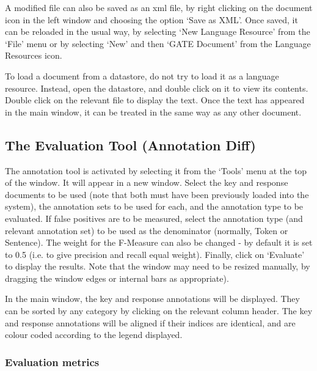 A modified file can also be saved as an xml file, by right clicking on
the document icon in the left window and choosing the
option `Save as XML'. Once saved, it can be reloaded in the usual way,
by selecting `New Language Resource' from the `File' menu or by
selecting `New' and then `GATE Document' from the Language Resources icon.

To load a document from a datastore, do not try to load it as a
language resource. Instead, open the datastore, and double click on
it to view its contents. Double click on the relevant file to display
the text. Once the text has appeared in the main window, it can be
treated in the same way as any other document.


\subsection{The Evaluation Tool (Annotation Diff)}

The annotation tool is activated by selecting it from the 
`Tools' menu at the top of the window. It will appear in a new
window. Select the key and response documents to be used (note that
both must have been previously loaded into the system), the annotation
sets to be used for each, and the annotation
type to be evaluated. If false positives are to be measured, select
the annotation type (and relevant annotation set) to be used as the
denominator (normally, Token or Sentence). The weight for the
F-Measure can also be changed - by default it is set to 0.5 (i.e. to
give precision and recall equal weight). Finally, click
on `Evaluate' to display the results. Note that the window may need to
be resized manually, by dragging the window edges or internal bars
as appropriate). 

In the main window, the key and response annotations will be
displayed. They can be sorted by any category by clicking on the
relevant column header. The key and response annotations will be aligned if
their indices are identical, and are colour coded according to the legend
displayed. 


\subsubsection{Evaluation metrics}

